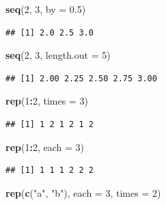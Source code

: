 \documentclass[]{book}
\newenvironment{Shaded}{\begin{snugshade}}{\end{snugshade}}
\newcommand{\KeywordTok}[1]{\textcolor[rgb]{0.13,0.29,0.53}{\textbf{#1}}}
\newcommand{\DataTypeTok}[1]{\textcolor[rgb]{0.13,0.29,0.53}{#1}}
\newcommand{\DecValTok}[1]{\textcolor[rgb]{0.00,0.00,0.81}{#1}}
\newcommand{\FloatTok}[1]{\textcolor[rgb]{0.00,0.00,0.81}{#1}}
\newcommand{\StringTok}[1]{\textcolor[rgb]{0.31,0.60,0.02}{#1}}
\newcommand{\OperatorTok}[1]{\textcolor[rgb]{0.81,0.36,0.00}{\textbf{#1}}}
\newcommand{\NormalTok}[1]{#1}
\begin{document}
\begin{Shaded}
\begin{Highlighting}[]
\KeywordTok{seq}\NormalTok{(}\DecValTok{2}\NormalTok{, }\DecValTok{3}\NormalTok{, }\DataTypeTok{by =} \FloatTok{0.5}\NormalTok{)}
\end{Highlighting}
\end{Shaded}

\begin{verbatim}
## [1] 2.0 2.5 3.0
\end{verbatim}

\begin{Shaded}
\begin{Highlighting}[]
\KeywordTok{seq}\NormalTok{(}\DecValTok{2}\NormalTok{, }\DecValTok{3}\NormalTok{, }\DataTypeTok{length.out =} \DecValTok{5}\NormalTok{)}
\end{Highlighting}
\end{Shaded}

\begin{verbatim}
## [1] 2.00 2.25 2.50 2.75 3.00
\end{verbatim}

\begin{Shaded}
\begin{Highlighting}[]
\KeywordTok{rep}\NormalTok{(}\DecValTok{1}\OperatorTok{:}\DecValTok{2}\NormalTok{, }\DataTypeTok{times =} \DecValTok{3}\NormalTok{)}
\end{Highlighting}
\end{Shaded}

\begin{verbatim}
## [1] 1 2 1 2 1 2
\end{verbatim}

\begin{Shaded}
\begin{Highlighting}[]
\KeywordTok{rep}\NormalTok{(}\DecValTok{1}\OperatorTok{:}\DecValTok{2}\NormalTok{, }\DataTypeTok{each =} \DecValTok{3}\NormalTok{)}
\end{Highlighting}
\end{Shaded}

\begin{verbatim}
## [1] 1 1 1 2 2 2
\end{verbatim}

\begin{Shaded}
\begin{Highlighting}[]
\KeywordTok{rep}\NormalTok{(}\KeywordTok{c}\NormalTok{(}\StringTok{"a"}\NormalTok{, }\StringTok{"b"}\NormalTok{), }\DataTypeTok{each =} \DecValTok{3}\NormalTok{, }\DataTypeTok{times =} \DecValTok{2}\NormalTok{)}
\end{Highlighting}
\end{Shaded}
\end{document}
